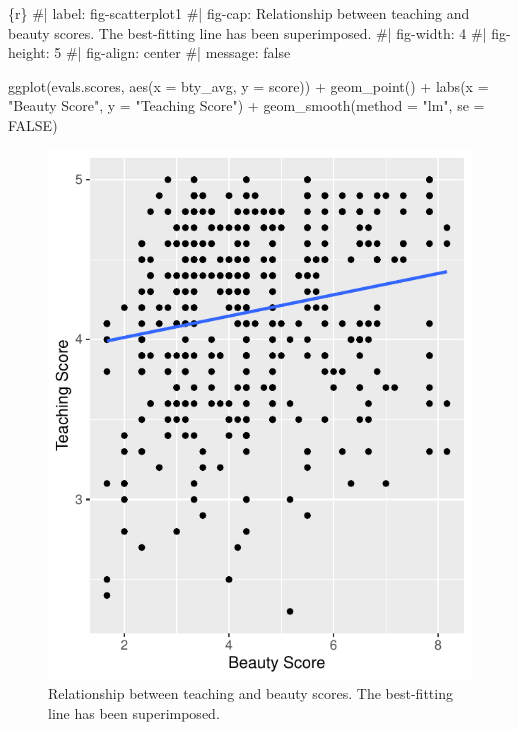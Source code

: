 \documentclass[
  letterpaper,
  DIV=11,
  numbers=noendperiod]{scrartcl}
\newenvironment{Shaded}{\begin{snugshade}}{\end{snugshade}}
\newcommand{\AttributeTok}[1]{\textcolor[rgb]{0.40,0.45,0.13}{#1}}
\newcommand{\CommentTok}[1]{\textcolor[rgb]{0.37,0.37,0.37}{#1}}
\newcommand{\ConstantTok}[1]{\textcolor[rgb]{0.56,0.35,0.01}{#1}}
\newcommand{\FunctionTok}[1]{\textcolor[rgb]{0.28,0.35,0.67}{#1}}
\newcommand{\InformationTok}[1]{\textcolor[rgb]{0.37,0.37,0.37}{#1}}
\newcommand{\NormalTok}[1]{\textcolor[rgb]{0.00,0.23,0.31}{#1}}
\newcommand{\SpecialCharTok}[1]{\textcolor[rgb]{0.37,0.37,0.37}{#1}}
\newcommand{\StringTok}[1]{\textcolor[rgb]{0.13,0.47,0.30}{#1}}
\begin{document}
\begin{Shaded}
\begin{Highlighting}[]
\InformationTok{\textasciigrave{}\textasciigrave{}\textasciigrave{}\{r\}}
\CommentTok{\#| label: fig{-}scatterplot1}
\CommentTok{\#| fig{-}cap: Relationship between teaching and beauty scores. The best{-}fitting line has been superimposed.}
\CommentTok{\#| fig{-}width: 4}
\CommentTok{\#| fig{-}height: 5}
\CommentTok{\#| fig{-}align: center}
\CommentTok{\#| message: false}

\FunctionTok{ggplot}\NormalTok{(evals.scores, }\FunctionTok{aes}\NormalTok{(}\AttributeTok{x =}\NormalTok{ bty\_avg, }\AttributeTok{y =}\NormalTok{ score)) }\SpecialCharTok{+}
  \FunctionTok{geom\_point}\NormalTok{() }\SpecialCharTok{+}
  \FunctionTok{labs}\NormalTok{(}\AttributeTok{x =} \StringTok{"Beauty Score"}\NormalTok{, }\AttributeTok{y =} \StringTok{"Teaching Score"}\NormalTok{) }\SpecialCharTok{+}
  \FunctionTok{geom\_smooth}\NormalTok{(}\AttributeTok{method =} \StringTok{"lm"}\NormalTok{, }\AttributeTok{se =} \ConstantTok{FALSE}\NormalTok{)}
\InformationTok{\textasciigrave{}\textasciigrave{}\textasciigrave{}}
\end{Highlighting}
\end{Shaded}

\begin{figure}[H]

{\centering \includegraphics{index_files/figure-pdf/fig-scatterplot1-1.pdf}

}

\caption{\label{fig-scatterplot1}Relationship between teaching and
beauty scores. The best-fitting line has been superimposed.}

\end{figure}
\end{document}
